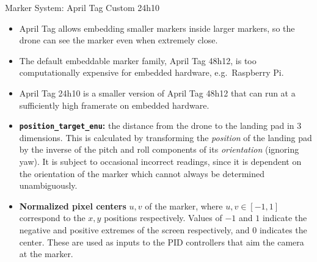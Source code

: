 \documentclass[final, 20pt]{beamer}
\newlength{\colwidth}
\begin{document}
\begin{frame}[t]
\begin{columns}[t]
\begin{column}{\colwidth}
\begin{block}{Marker System: April Tag Custom 24h10}
    \begin{itemize}
      \item April Tag allows embedding smaller markers inside larger markers,
            so the drone can see the marker even when extremely close.
      \item The default embeddable marker family, April Tag 48h12, is too computationally expensive for embedded hardware, e.g.~Raspberry Pi.
      \item April Tag 24h10 is a smaller version of April Tag 48h12 that can run at a sufficiently high framerate on embedded hardware.
    \end{itemize}
    \begin{itemize}
      \item \textbf{\texttt{position\_target\_enu}:} the distance from the drone to the landing pad in 3 dimensions.
                    This is calculated by transforming the \textit{position} of the landing pad by
                    the inverse of the pitch and roll components of its \textit{orientation} (ignoring yaw).
                    It is subject to occasional incorrect readings, since it is dependent on the orientation of the marker which cannot always be determined unambiguously.
      \item \textbf{Normalized pixel centers} $u,v$ of the marker, where $u,v \in [-1,1]$ correspond to the $x,y$ positions respectively.
                    Values of $-1$ and $1$ indicate the negative and positive extremes of the screen respectively, and $0$ indicates the center.
                    These are used as inputs to the PID controllers that aim the camera at the marker.
    \end{itemize}





\end{block}
\end{column}
\end{columns}
\end{frame}
\end{document}
